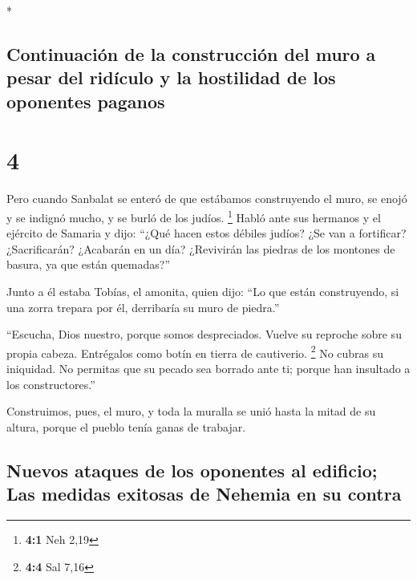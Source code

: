 \begin{paracol}{2}
\begin{otherlanguage}{english}
\end{otherlanguage}

\switchcolumn[0]*

\hypertarget{continuaciuxf3n-de-la-construcciuxf3n-del-muro-a-pesar-del-riduxedculo-y-la-hostilidad-de-los-oponentes-paganos}{%
\subsection{Continuación de la construcción del muro a pesar del
ridículo y la hostilidad de los oponentes
paganos}\label{continuaciuxf3n-de-la-construcciuxf3n-del-muro-a-pesar-del-riduxedculo-y-la-hostilidad-de-los-oponentes-paganos}}

\hypertarget{section-6}{%
\section{4}\label{section-6}}

 Pero cuando Sanbalat se enteró de que estábamos
construyendo el muro, se enojó y se indignó mucho, y se burló de los
judíos. \footnote{\textbf{4:1} Neh 2,19}  Habló ante sus
hermanos y el ejército de Samaria y dijo: ``¿Qué hacen estos débiles
judíos? ¿Se van a fortificar? ¿Sacrificarán? ¿Acabarán en un día?
¿Revivirán las piedras de los montones de basura, ya que están
quemadas?''

 Junto a él estaba Tobías, el amonita, quien dijo: ``Lo
que están construyendo, si una zorra trepara por él, derribaría su muro
de piedra.''

 ``Escucha, Dios nuestro, porque somos despreciados.
Vuelve su reproche sobre su propia cabeza. Entrégalos como botín en
tierra de cautiverio. \footnote{\textbf{4:4} Sal 7,16}  No
cubras su iniquidad. No permitas que su pecado sea borrado ante ti;
porque han insultado a los constructores.''

 Construimos, pues, el muro, y toda la muralla se unió
hasta la mitad de su altura, porque el pueblo tenía ganas de trabajar.

\hypertarget{nuevos-ataques-de-los-oponentes-al-edificio-las-medidas-exitosas-de-nehemia-en-su-contra}{%
\subsection{Nuevos ataques de los oponentes al edificio; Las medidas
exitosas de Nehemia en su
contra}\label{nuevos-ataques-de-los-oponentes-al-edificio-las-medidas-exitosas-de-nehemia-en-su-contra}}


\end{paracol}
